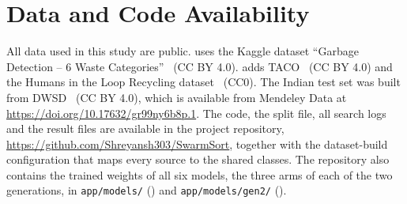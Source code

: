 \section*{Data and Code Availability}
All data used in this study are public. \genone uses the Kaggle dataset ``Garbage Detection -- 6 Waste Categories''~\cite{viswaprakash2024garbage} (CC BY 4.0). \gentwo adds TACO~\cite{proenca2020taco} (CC BY 4.0) and the Humans in the Loop Recycling dataset~\cite{hitl2026recycling} (CC0). The Indian test set was built from DWSD~\cite{ali2025dwsd} (CC BY 4.0), which is available from Mendeley Data at \url{https://doi.org/10.17632/gr99ny6b8p.1}. The code, the split file, all search logs and the result files are available in the project repository, \url{https://github.com/Shreyansh303/SwarmSort}, together with the dataset-build configuration that maps every source to the shared classes. The repository also contains the trained weights of all six models, the three arms of each of the two generations, in \texttt{app/models/} (\genone) and \texttt{app/models/gen2/} (\gentwo).
